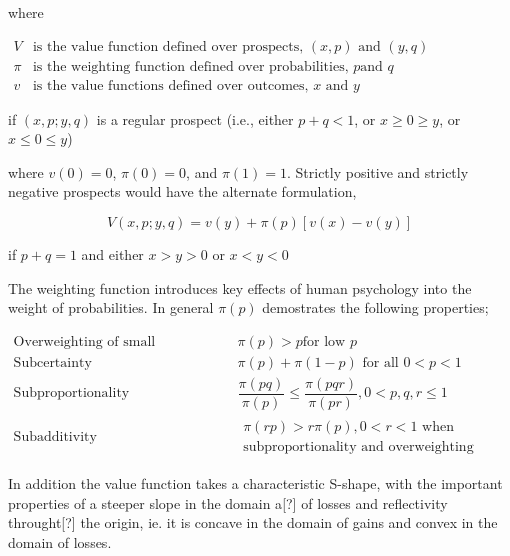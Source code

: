 \documentclass{ucthesis}
\begin{document}
where

$%
\begin{array}{ll}
V & \text{is the value function defined over prospects, }\left( x,p\right) 
\text{ and }\left( y,q\right) \\ 
\pi & \text{is the weighting function defined over probabilities, }p\text{
and }q \\ 
v & \text{is the value functions defined over outcomes, }x\text{ and }y%
\end{array}%
$

if $\left( x,p;y,q\right) $ is a regular prospect (i.e., either $p+q<1$, or $%
x\geq 0\geq y$, or $x\leq 0\leq y$)

where $v\left( 0\right) =0$, $\pi \left( 0\right) =0$, and $\pi \left(
1\right) =1$. Strictly positive and strictly negative prospects would have
the alternate formulation,

\[
V\left( x,p;y,q\right) =v\left( y\right) +\pi \left( p\right) \left[ v\left(
x\right) -v\left( y\right) \right] 
\]

if $p+q=1$ and either $x>y>0$ or $x<y<0$

The weighting function introduces key effects of human psychology into the
weight of probabilities. In general $\pi \left( p\right) $ demostrates the
following properties;

$%
\begin{array}{ll}
\text{Overweighting of small probabilities} & \pi \left( p\right) >p\text{
for low }p \\ 
\text{Subcertainty} & \pi \left( p\right) +\pi \left( 1-p\right) \text{ for
all }0<p<1 \\ 
\text{Subproportionality} & \dfrac{\pi \left( pq\right) }{\pi \left(
p\right) }\leq \dfrac{\pi \left( pqr\right) }{\pi \left( pr\right) }%
,0<p,q,r\leq 1 \\ 
\text{Subadditivity} & 
\begin{array}{l}
\pi \left( rp\right) >r\pi \left( p\right) ,0<r<1\text{ when } \\ 
\text{subproportionality and overweighting hold}%
\end{array}%
\end{array}%
$

In addition the value function takes a characteristic S-shape, with the
important properties of a steeper slope in the domain a{\LARGE [?]} of
losses and reflectivity throught{\LARGE [?]} the origin, ie. it is concave
in the domain of gains and convex in the domain of losses.
\end{document}
